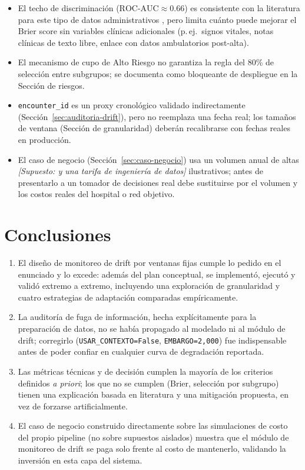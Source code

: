 \documentclass[11pt,a4paper]{article}
\newcommand{\supuesto}[1]{\textit{[Supuesto: #1]}}
\begin{document}
\begin{itemize}[leftmargin=*]
    \item El techo de discriminación ($\text{ROC-AUC}\approx 0.66$) es consistente con la literatura para este tipo de datos administrativos \cite{kansagara2011}, pero limita cuánto puede mejorar el Brier score sin variables clínicas adicionales (p.\,ej.\ signos vitales, notas clínicas de texto libre, enlace con datos ambulatorios post-alta).
    \item El mecanismo de cupo de Alto Riesgo no garantiza la regla del 80\% de selección entre subgrupos; se documenta como bloqueante de despliegue en la Sección de riesgos.
    \item \texttt{encounter\_id} es un proxy cronológico validado indirectamente (Sección~\ref{sec:auditoria-drift}), pero no reemplaza una fecha real; los tamaños de ventana (Sección de granularidad) deberán recalibrarse con fechas reales en producción.
    \item El caso de negocio (Sección~\ref{sec:caso-negocio}) usa un volumen anual de altas \supuesto{y una tarifa de ingeniería de datos} ilustrativos; antes de presentarlo a un tomador de decisiones real debe sustituirse por el volumen y los costos reales del hospital o red objetivo.
\end{itemize}

\section{Conclusiones}

\begin{enumerate}[leftmargin=*]
    \item El diseño de monitoreo de drift por ventanas fijas cumple lo pedido en el enunciado y lo excede: además del plan conceptual, se implementó, ejecutó y validó extremo a extremo, incluyendo una exploración de granularidad y cuatro estrategias de adaptación comparadas empíricamente.
    \item La auditoría de fuga de información, hecha explícitamente para la preparación de datos, no se había propagado al modelado ni al módulo de drift; corregirlo (\texttt{USAR\_CONTEXTO=False}, \texttt{EMBARGO=2{,}000}) fue indispensable antes de poder confiar en cualquier curva de degradación reportada.
    \item Las métricas técnicas y de decisión cumplen la mayoría de los criterios definidos \emph{a priori}; los que no se cumplen (Brier, selección por subgrupo) tienen una explicación basada en literatura y una mitigación propuesta, en vez de forzarse artificialmente.
    \item El caso de negocio construido directamente sobre las simulaciones de costo del propio pipeline (no sobre supuestos aislados) muestra que el módulo de monitoreo de drift se paga solo frente al costo de mantenerlo, validando la inversión en esta capa del sistema.
\end{enumerate}
\end{document}
